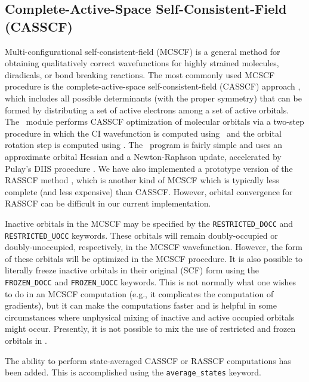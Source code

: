 \subsection{Complete-Active-Space Self-Consistent-Field (CASSCF)} \label{casscf}
                                                                                
Multi-configurational self-consistent-field (MCSCF) 
is a general method for obtaining qualitatively correct
wavefunctions for highly strained molecules, diradicals, or bond
breaking reactions.  The most commonly used MCSCF procedure
is the complete-active-space self-consistent-field (CASSCF)
approach \cite{Roos:1980}, which includes all possible determinants
(with the proper symmetry) that can be formed by distributing 
a set of active electrons among a set of active orbitals.
The \PSIdetcasman\ module performs
CASSCF optimization of molecular orbitals via a two-step
procedure in which the CI wavefunction is computed using
\PSIdetci\, and the orbital rotation step is computed using
\PSIdetcas.  The \PSIdetcas\ program is fairly simple
and uses an approximate orbital Hessian \cite{Chaban:1997:88} 
and a Newton-Raphson update,
accelerated by Pulay's DIIS procedure \cite{Pulay:1980}.  
We have also implemented a prototype version of the RASSCF method
\cite{Malmqvist:1990:RASSCF}, which is another kind of MCSCF which 
is typically less complete (and less expensive) than CASSCF.
However, orbital convergence for RASSCF can be difficult in our
current implementation.

Inactive orbitals in the MCSCF may be specified by the 
{\tt RESTRICTED\_DOCC} and {\tt RESTRICTED\_UOCC} keywords.  These
orbitals will remain doubly-occupied or doubly-unoccupied, respectively,
in the MCSCF wavefunction.  However, the form of these orbitals will
be optimized in the MCSCF procedure.  It is also possible to 
literally freeze inactive orbitals in their original (SCF) form
using the {\tt FROZEN\_DOCC} and {\tt FROZEN\_UOCC} keywords.
This is not normally what one wishes to do in an MCSCF computation
(e.g., it complicates the computation of gradients),
but it can make the computations faster and is helpful in some
circumstances where unphysical mixing of inactive and active
occupied orbitals might occur.  Presently, it is not possible
to mix the use of restricted and frozen orbitals in \PSIthree.

The ability to perform state-averaged 
\cite{Docken:1972:4928,Ruedenberg:1979:1069}
CASSCF or RASSCF computations has been added.  This is accomplished using the 
{\tt average\_states} keyword.

